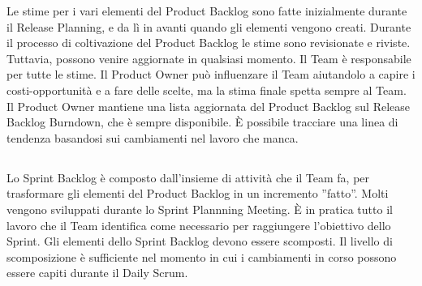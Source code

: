 Le stime per i vari elementi del Product Backlog sono fatte inizialmente durante il Release Planning, e da l\`i in avanti quando gli elementi vengono creati. Durante il processo di coltivazione del Product Backlog le stime sono revisionate e riviste. Tuttavia, possono venire aggiornate in qualsiasi momento. Il Team \`e responsabile per tutte le stime. Il Product Owner pu\`o influenzare il Team aiutandolo a capire i costi-opportunit\`a e a fare delle scelte, ma la stima finale spetta sempre al Team. Il Product Owner mantiene una lista aggiornata del Product Backlog sul Release Backlog Burndown, che \`e sempre disponibile. \`E possibile tracciare una linea di tendenza basandosi sui cambiamenti nel lavoro che manca.  


  
\subsection*{\color{Blue}{SPRINT BACKLOG E SPRINT BURNDOWN}}
\label{sec:sprintbacklog}

Lo Sprint Backlog \`e composto dall'insieme di attivit\`a che il Team fa, per trasformare gli elementi del Product Backlog in un incremento ''fatto''. Molti vengono sviluppati durante lo Sprint Plannning Meeting. \`E in pratica tutto il lavoro che il Team identifica come necessario per raggiungere l'obiettivo dello Sprint. Gli elementi dello Sprint Backlog devono essere scomposti. Il livello di scomposizione \`e sufficiente nel momento in cui i cambiamenti in corso possono essere capiti durante il Daily Scrum.

